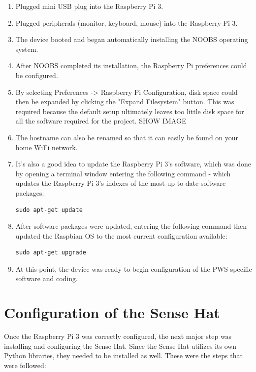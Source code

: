 \documentclass[sigconf]{acmart}
\begin{document}
\begin{enumerate}
\item Plugged mini USB plug into the Raspberry Pi 3.
\item Plugged peripherals (monitor, keyboard, mouse) into the Raspberry Pi 3.
\item The device booted and began automatically installing the NOOBS operating system.
\item After NOOBS completed its installation, the Raspberry Pi preferences could be configured. 
\item By selecting Preferences -> Raspberry Pi Configuration, disk space could then be expanded by clicking the "Expand Filesystem" button. This was required because the default setup ultimately leaves too little disk space for all the software required for the project. SHOW IMAGE
\item The hostname can also be renamed so that it can easily be found on your home WiFi network.
\item It's also a good idea to update the Raspberry Pi 3's software, which was done by opening a terminal window entering the following command - which updates the Raspberry Pi 3's indexes of the most up-to-date software packages:


\begin{verbatim}
sudo apt-get update
\end{verbatim}

\item After software packages were updated, entering the following command then updated the Raspbian OS to the most current configuration available:

\begin{verbatim}
sudo apt-get upgrade
\end{verbatim}

\item At this point, the device was ready to begin configuration of the PWS specific software and coding.
\end{enumerate}

\section{Configuration of the Sense Hat}

Once the Raspberry Pi 3 was correctly configured, the next major step was installing and configuring the Sense Hat. Since the Sense Hat utilizes its own Python libraries, they needed to be installed as well. These were the steps that were followed:
\end{document}
